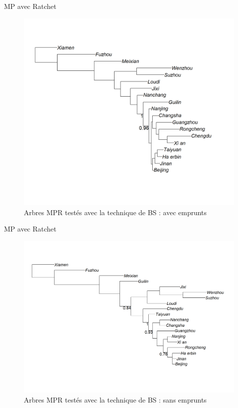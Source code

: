 \documentclass[11pt]{beamer}
\begin{document}
\begin{frame}{MP avec Ratchet}
\flushleft
\begin{figure}
\centering
\includegraphics[scale=.15]{Figure/MPR_BS_with}
\caption{Arbres MPR testés avec la technique de BS : avec emprunts}
\label{MPR1}
\end{figure}
\end{frame}

\begin{frame}{MP avec Ratchet}
\begin{figure}
\centering
\includegraphics[scale=.15]{Figure/MPR_BS_without}
\caption{Arbres MPR testés avec la technique de BS : sans emprunts}
\label{Fig:MPR2}
\end{figure}
\end{frame}
\end{document}
